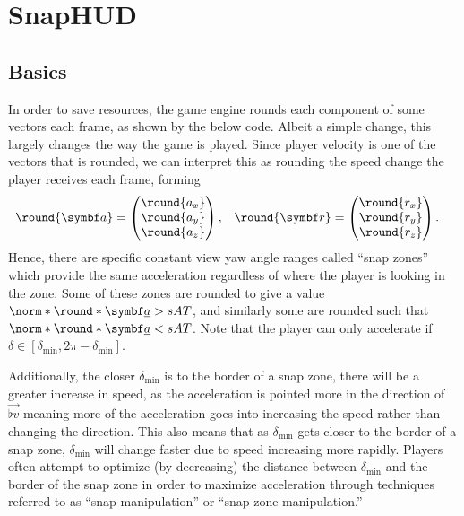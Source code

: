 \section{SnapHUD}
\label{sec:snaphud}

\subsection{Basics}
\label{sec:snap_basics}
In order to save resources, the game engine rounds each component of some vectors each frame, as shown by the below code. Albeit a simple change, this largely changes the way the game is played.
Since player velocity is one of the vectors that is rounded, we can interpret this as rounding the speed change the player receives each frame, forming
\begin{align*}
\round{\vec{a}} &=
\begin{pmatrix}
\round{a_x} \\ \round{a_y} \\ \round{a_z}
\end{pmatrix}, & \round{\vec{r}} &=
\begin{pmatrix}
\round{r_x} \\ \round{r_y} \\ \round{r_z}
\end{pmatrix}.
\end{align*}
Hence, there are specific constant view yaw angle ranges called ``snap zones'' which provide the same acceleration regardless of where the player is looking in the zone.
Some of these zones are rounded to give a value $\norm*{\round*{\vec{\flat{a}}}} > sAT$, and similarly some are rounded such that $\norm*{\round*{\vec{\flat{a}}}} < sAT$.
Note that the player can only accelerate if $\delta \in [\delta_{\min}, 2\pi - \delta_{\min}]$.

Additionally, the closer $\delta_{\min}$ is to the border of a snap zone, there will be a greater increase in speed, as the acceleration is pointed more in the direction of $\vec{\flat{v}}$ meaning more of the acceleration goes into increasing the speed rather than changing the direction.
This also means that as $\delta_{\min}$ gets closer to the border of a snap zone, $\delta_{\min}$ will change faster due to speed increasing more rapidly.
Players often attempt to optimize (by decreasing) the distance between $\delta_{\min}$ and the border of the snap zone in order to maximize acceleration through techniques referred to as ``snap manipulation'' or ``snap zone manipulation.''\\

